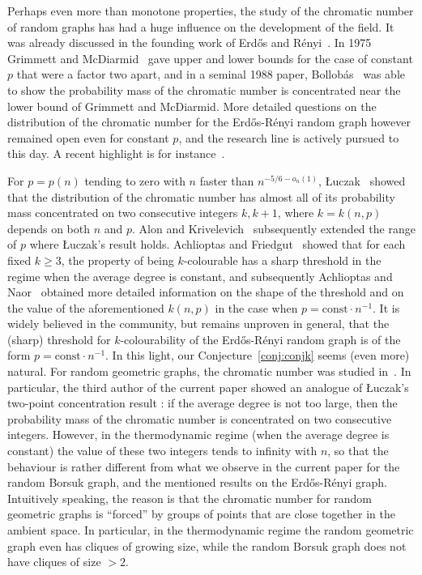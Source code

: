 \documentclass[11pt]{article}%
\begin{document}
Perhaps even more than monotone properties, the study of the chromatic number of random graphs has had a huge influence
on the development of the field. 
It was already discussed in the founding work of Erd\H{o}s and R\'enyi~\cite{ErdosRenyi60}.
In 1975 Grimmett and McDiarmid~\cite{GrimmettMcDiarmid75} gave upper and lower bounds for the case of constant $p$ that were a factor two 
apart, and in a seminal 1988 paper, Bollob\'as~\cite{Bollobas88} was able to show the probability mass 
of the chromatic number is concentrated near the lower bound of Grimmett and 
McDiarmid. More detailed questions on the 
distribution of the chromatic number for the Erd\H{o}s-R\'enyi random graph however remained open even for constant $p$, and 
the research line is actively pursued to this day. A recent highlight is for instance~\cite{Heckel21}.

For $p = p(n)$ tending to zero with $n$ faster than $n^{-5/6-o_n(1)}$, {\L}uczak~\cite{Luczak91} showed that the 
distribution of the chromatic number has almost all of its probability mass concentrated on 
two consecutive integers $k,k+1$, where $k=k(n,p)$ depends on both $n$ and $p$. Alon and Krivelevich~\cite{AlonKrivelevich} subsequently 
extended the range of $p$ where {\L}uczak's result holds.
Achlioptas and Friedgut~\cite{AchlioptasFriedgut} showed that for each fixed $k\geq 3$, the property of 
being $k$-colourable has a sharp threshold in the regime when the average degree is constant, and 
subsequently Achlioptas and Naor~\cite{AchlioptasNaor} obtained more detailed information on 
the shape of the threshold and on the value of the aforementioned $k(n,p)$ in the 
case when $p = \text{const} \cdot n^{-1}$.
It is widely believed in the community, but remains unproven in general, that the (sharp) threshold for $k$-colourability 
of the Erd\H{o}s-R\'enyi random graph is of the form $p = \text{const} \cdot n^{-1}$.
In this light, our Conjecture~\ref{conj:conjk} seems (even more) natural.
For random geometric graphs, the chromatic number was studied in~\cite{McDiarmidMuller, Mullertwopoint, penroseboek}.
In particular, the third author of the current paper showed an analogue of {\L}uczak's two-point concentration result : 
if the average degree is not too large, then the probability mass of the chromatic number is concentrated on 
two consecutive integers. However, in the thermodynamic regime (when the average degree is constant) the
value of these two integers tends to infinity with $n$, so that the behaviour is rather different 
from what we observe in the current paper for the random Borsuk graph, and the mentioned results
on the Erd\H{o}s-R\'enyi graph. Intuitively speaking, the reason is that the chromatic number 
for random geometric graphs is ``forced'' by groups of points that are close together in 
the ambient space. In particular, in the thermodynamic regime the random geometric graph even has cliques of
growing size, while the random Borsuk graph does not have cliques of size $>2$.
\end{document}
